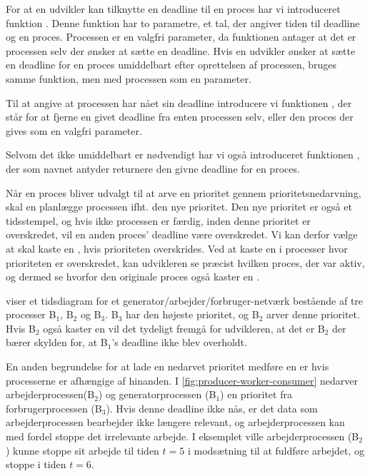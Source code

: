 For at en udvikler kan  tilknytte en deadline til en proces har vi introduceret funktion . Denne funktion har to parametre, et tal, der  angiver tiden  til deadline og en proces. Processen er en valgfri parameter, da funktionen antager at det er processen selv der ønsker at sætte en deadline. Hvis en udvikler ønsker at sætte en deadline for en proces umiddelbart efter oprettelsen af processen, bruges samme funktion, men med processen som en parameter.

Til at angive at processen har nået sin deadline introducere vi funktionen , der står for at fjerne en givet deadline fra enten processen selv, eller den proces der gives som en valgfri parameter.

Selvom det ikke umiddelbart er nødvendigt har vi også introduceret funktionen , der som navnet antyder returnere den givne deadline for en proces.

Når en proces bliver udvalgt til at arve en prioritet gennem prioritetsnedarvning, skal \sched en  planlægge processen ifht. den nye prioritet.
Den nye prioritet er også et tidsstempel, og hvis ikke processen er færdig, inden denne prioritet er overskredet, vil en anden proces' deadline være overskredet. 
Vi kan derfor vælge at  skal kaste en  ,  hvis  prioriteten overskrides. Ved at kaste en  i processer hvor prioriteten er overskredet, kan udvikleren se præcist hvilken proces, der var aktiv, og dermed se hvorfor den originale proces også kaster en . 

 viser et tidsdiagram for et generator/arbejder/forbruger-netværk bestående af tre processer B$_1$, B$_2$ og B$_3$. B$_3$ har den højeste prioritet, og B$_2$ arver denne prioritet. Hvis B$_2$ også kaster en  vil det tydeligt fremgå for udvikleren, at det er B$_2$ der bærer skylden for, at B$_1$'s deadline ikke blev overholdt.

En anden begrundelse for at lade en nedarvet prioritet medføre en  er hvis processerne er afhængige af hinanden. I \cref{fig:producer-worker-consumer}  nedarver  arbejderprocessen(B$_2$) og generatorprocessen (B$_1$) en  prioritet fra forbrugerprocessen (B$_3$). Hvis denne deadline ikke nås, er det data som arbejderprocessen bearbejder ikke længere relevant, og arbejderprocessen kan med fordel stoppe det irrelevante arbejde. I eksemplet ville arbejderprocessen (B$_2$) kunne stoppe sit arbejde til tiden $t = 5$ i modsætning til at fuldføre arbejdet, og stoppe i tiden $t = 6$.

